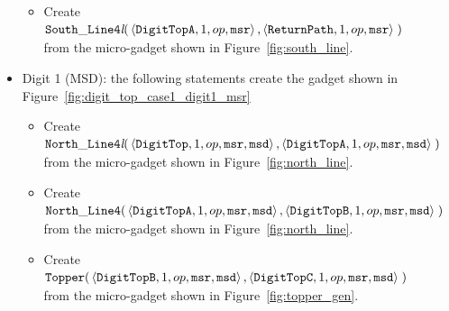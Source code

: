 \begin{itemize}
\begin{itemize}
            \item Create
            $\begin{aligned}[t]
                {\tt South\_Line4\textit{l}}(& \left\langle {\tt DigitTopA}, 1, op, {\tt msr}\right\rangle,
                                               \left\langle {\tt ReturnPath},     1, op, {\tt msr}\right\rangle \;)
            \end{aligned}$ \\ from the micro-gadget shown in Figure~\ref{fig:south_line}.
        \end{itemize}
        \vspace{1cm}


        \item Digit 1 (MSD): the following statements create the gadget shown in Figure~\ref{fig:digit_top_case1_digit1_msr}
        \begin{itemize}
            \item Create
            $\begin{aligned}[t]
                {\tt North\_Line4\textit{l}}(& \left\langle {\tt DigitTop},  1, op, {\tt msr}, {\tt msd}\right\rangle,
                                               \left\langle {\tt DigitTopA}, 1, op, {\tt msr}, {\tt msd}\right\rangle \;)
            \end{aligned}$\\from the micro-gadget shown in Figure~\ref{fig:north_line}.

            \item Create $\begin{aligned}[t]
                {\tt North\_Line4}(& \left\langle {\tt DigitTopA}, 1, op, {\tt msr}, {\tt msd}\right\rangle,
                                     \left\langle {\tt DigitTopB}, 1, op, {\tt msr}, {\tt msd}\right\rangle \;)
            \end{aligned}$\\from the micro-gadget shown in Figure~\ref{fig:north_line}.

            \item Create $\begin{aligned}[t]
                {\tt Topper}(& \left\langle {\tt DigitTopB}, 1, op, {\tt msr}, {\tt msd}\right\rangle,
                               \left\langle {\tt DigitTopC}, 1, op, {\tt msr}, {\tt msd}\right\rangle \;)
            \end{aligned}$\\from the micro-gadget shown in Figure~\ref{fig:topper_gen}.


\end{itemize}
\end{itemize}
